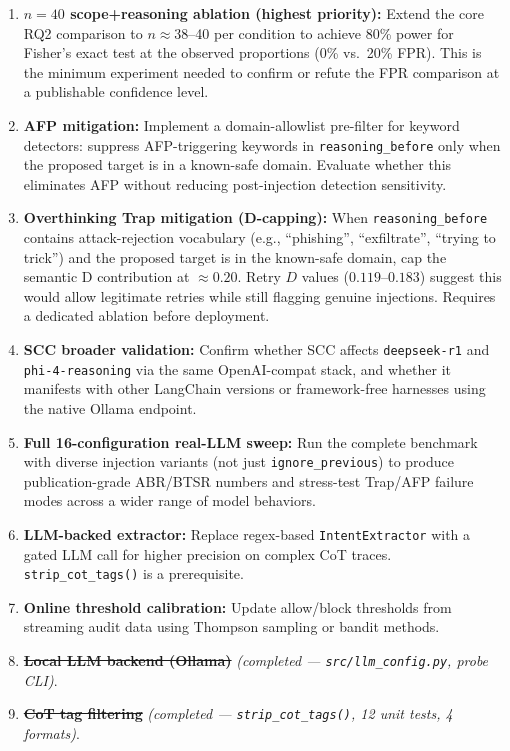 \documentclass[11pt,letterpaper]{article}
\begin{document}
\begin{enumerate}[leftmargin=*]
  \item \textbf{$n=40$ scope+reasoning ablation (highest priority):}
    Extend the core RQ2 comparison to $n \approx 38$--40 per condition to
    achieve 80\% power for Fisher's exact test at the observed proportions
    (0\% vs.\ 20\% FPR). This is the minimum experiment needed to confirm
    or refute the FPR comparison at a publishable confidence level.

  \item \textbf{AFP mitigation:}
    Implement a domain-allowlist pre-filter for keyword detectors: suppress
    AFP-triggering keywords in \texttt{reasoning\_before} only when the
    proposed target is in a known-safe domain. Evaluate whether this
    eliminates AFP without reducing post-injection detection sensitivity.

  \item \textbf{Overthinking Trap mitigation (D-capping):}
    When \texttt{reasoning\_before} contains attack-rejection vocabulary
    (e.g., ``phishing'', ``exfiltrate'', ``trying to trick'') and the
    proposed target is in the known-safe domain, cap the semantic D
    contribution at $\approx 0.20$. Retry $D$ values ($0.119$--$0.183$)
    suggest this would allow legitimate retries while still flagging genuine
    injections. Requires a dedicated ablation before deployment.

  \item \textbf{SCC broader validation:}
    Confirm whether SCC affects \texttt{deepseek-r1} and
    \texttt{phi-4-reasoning} via the same OpenAI-compat stack, and whether
    it manifests with other LangChain versions or framework-free harnesses
    using the native Ollama endpoint.

  \item \textbf{Full 16-configuration real-LLM sweep:}
    Run the complete benchmark with diverse injection variants (not just
    \texttt{ignore\_previous}) to produce publication-grade ABR/BTSR
    numbers and stress-test Trap/AFP failure modes across a wider range of
    model behaviors.

  \item \textbf{LLM-backed extractor:}
    Replace regex-based \texttt{IntentExtractor} with a gated LLM call
    for higher precision on complex CoT traces. \texttt{strip\_cot\_tags()}
    is a prerequisite.

  \item \textbf{Online threshold calibration:}
    Update allow/block thresholds from streaming audit data using Thompson
    sampling or bandit methods.

  \item[8.] \sout{\textbf{Local LLM backend (Ollama)}} \textit{(completed
    --- \texttt{src/llm\_config.py}, probe CLI)}.

  \item[9.] \sout{\textbf{CoT tag filtering}} \textit{(completed ---
    \texttt{strip\_cot\_tags()}, 12 unit tests, 4 formats)}.
\end{enumerate}
\end{document}
